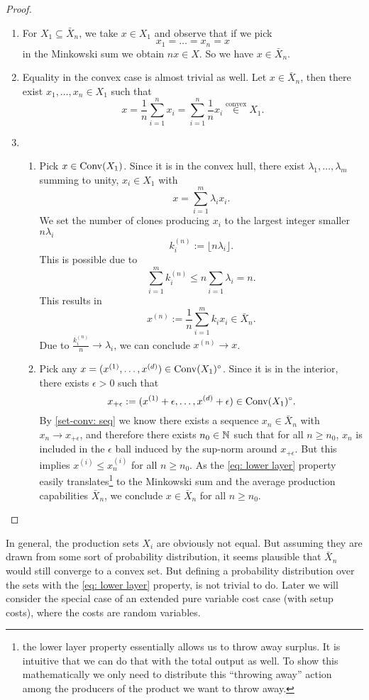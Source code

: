 \begin{proof}
\begin{enumerate}
	\item For \(X_1 \subseteq \bar{X}_n\), we take \(x\in X_1\) and
	observe that if we pick 
	\[
		x_1=\dots=x_n=x
	\]
	in the Minkowski sum we obtain \(n x \in X\). So we have
	\(x\in\bar{X}_n\).
	

	\item
	Equality in the convex case is almost trivial as well. Let \(x\in
	\bar{X}_n\), then there exist \(x_1,\dots,x_n \in X_1\) such that \[
		x = \frac1n \sum_{i=1}^n x_i = \sum_{i=1}^n \frac1n x_i
		\overset{\text{convex}}\in X_1.
	\]

	\item
	\begin{enumerate}
		\item Pick \(x\in \operatorname{Conv}(X_1)\). Since it is in the convex hull,
		there exist \(\lambda_1,\dots,\lambda_m\) summing to unity, \(x_i\in X_1\)
		with
		\[
			x = \sum_{i=1}^m \lambda_i x_i.
		\]
		We set the number of clones producing \(x_i\) to the largest integer smaller
		\(n\lambda_i\)
		\[
			k_i^{(n)} := \lfloor n\lambda_i \rfloor.
		\]
		This is possible due to	
		\[
			\sum_{i=1}^m k_i^{(n)} \le n \sum_{i=1} \lambda_i = n.
		\]
		This results in
		\[
			x^{(n)}:= \frac1n\sum_{i=1}^m k_i x_i \in \bar{X}_n.
		\]
		Due to \(\frac{k_i^{(n)}}{n}\to \lambda_i\), we can conclude \(x^{(n)}\to
		x\).
		
		\item
		Pick any \(x=(x^{(1)},\dots,x^{(d)})\in\operatorname{Conv}(X_1)^\circ\). Since it is
		in the interior, there exists \(\epsilon>0\) such that
		\[
			x_{+\epsilon}
			:= (x^{(1)}+\epsilon, \dots, x^{(d)}+\epsilon) \in \operatorname{Conv}(X_1)^\circ.
		\]
		By \ref{set-conv: seq} we know there exists a sequence
		\(x_n\in\bar{X}_n\) with \(x_n\to x_{+\epsilon}\), and therefore there exists
		\(n_0\in\mathbb{N}\) such that for all \(n\ge n_0\), \(x_n\) is included in the
		\(\epsilon\) ball induced by the sup-norm around \(x_{+\epsilon}\). But this
		implies \(x^{(i)} \le x^{(i)}_n\) for all \(n\ge n_0\). As the \ref{eq: lower
		layer} property easily translates\footnote{
			the lower layer property essentially allows us to throw away surplus. It
			is intuitive that we can do that with the total output as well. To show
			this mathematically we only need to distribute this ``throwing away''
			action among the producers of the product we want to throw away.
		} to the
		Minkowski sum and the average production capabilities \(\bar{X}_n\), we
		conclude \(x\in\bar{X}_n\) for all \(n\ge n_0\).
		\qedhere
	\end{enumerate}
\end{enumerate}
\end{proof}

In general, the production sets \(X_i\) are obviously not equal. But assuming
they are drawn from some sort of probability distribution, it seems plausible
that \(\bar{X}_n\) would still converge to a convex set. But defining a
probability distribution over the sets with the \ref{eq: lower layer} property,
is not trivial to do. Later we will consider the special case of an
extended pure variable cost case (with setup costs), where the costs are random
variables.